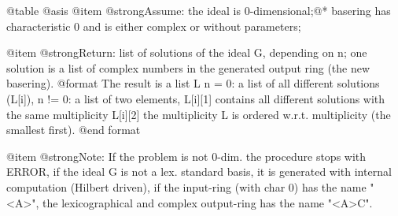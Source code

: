 @table @asis
@item @strong{Assume:}
the ideal is 0-dimensional;@*
basering has characteristic 0 and is either complex or
without parameters;

@item @strong{Return:}
list of solutions of the ideal G, depending on n; one solution is a
list of complex numbers in the generated output ring (the new
basering).
@format
 The result is a list L
    n  = 0: a list of all different solutions (L[i]),
    n != 0: a list of two elements,
            L[i][1] contains all different solutions with the same multiplicity
            L[i][2] the multiplicity
 L is ordered w.r.t. multiplicity (the smallest first).
@end format

@item @strong{Note:}
If the problem is not 0-dim. the procedure stops with ERROR, if the
ideal G is not a lex. standard basis, it is generated with internal
computation (Hilbert driven), if the input-ring (with char 0) has
the name "<A>", the lexicographical and complex output-ring has the
name "<A>C".

